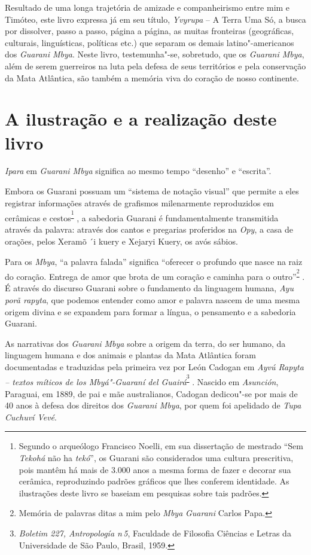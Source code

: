 Resultado de uma longa trajetória de amizade e companheirismo entre mim
e Timóteo, este livro expressa já em seu
título, \emph{{Yvyrupa}} {-- A Terra Uma Só}, a busca por
dissolver, passo a passo, página a página, as muitas fronteiras
(geográficas, culturais, linguísticas, políticas etc.) que separam os
demais latino"-americanos dos \emph{Guarani Mbya}. Neste livro,
testemunha"-se, sobretudo, que os \emph{Guarani Mbya}, além de serem
guerreiros na luta pela defesa de seus territórios e pela conservação da
Mata Atlântica, são também a memória viva do coração de nosso
continente.

 

 

\section{A ilustração e a realização deste livro}

\emph{Ipara} em \emph{Guarani Mbya} significa ao mesmo tempo ``desenho''
e ``escrita''.

Embora os Guarani possuam um ``sistema de notação visual'' que permite a
eles registrar informações através de grafismos milenarmente
reproduzidos em cerâmicas e cestos\textsuperscript{\footnote{ Segundo o arqueólogo Francisco Noelli, em sua dissertação de mestrado
``Sem \emph{Tekohá} não ha \emph{tekó}'', os Guarani são considerados
uma cultura prescritiva, pois mantêm há mais de 3.000 anos a mesma forma
de fazer e decorar sua cerâmica, reproduzindo padrões gráficos que lhes
conferem identidade. As ilustrações deste livro se baseiam em pesquisas
sobre tais padrões.} },
a sabedoria Guarani é fundamentalmente transmitida através da palavra:
através dos cantos e pregarias proferidos na \emph{Opy}, a casa de
orações, pelos Xeramõ ´i kuery e Xejaryi Kuery, os avós sábios.

Para os \emph{Mbya}, ``a palavra falada'' significa ``oferecer o
profundo que nasce na raiz do coração. Entrega de amor que brota de um
coração e caminha para o outro''\textsuperscript{\footnote{ Memória de palavras ditas a mim pelo \emph{Mbya} \emph{Guarani} Carlos
Papa.} }. É através do discurso Guarani sobre o fundamento da linguagem humana,
\emph{Ayu porã rapyta}, que podemos entender como amor e palavra nascem
de uma mesma origem divina e se expandem para formar a língua, o
pensamento e a sabedoria Guarani.

As narrativas dos \emph{Guarani Mbya} sobre a origem da terra, do ser
humano, da linguagem humana e dos animais e plantas da Mata Atlântica
foram documentadas e traduzidas pela primeira vez por León Cadogan em
\emph{Ayvú Rapyta -- textos míticos de los Mbyá"-Guaraní del
Guairá}\textsuperscript{\footnote{ \emph{Boletim 227, Antropología n\,5}, Faculdade de Filosofia Ciências e
Letras da Universidade de São Paulo, Brasil, 1959.} }. Nascido em
\emph{Asunción}, Paraguai, em 1889, de pai e mãe australianos, Cadogan
dedicou"-se por mais de 40 anos à defesa dos direitos dos \emph{Guarani
Mbya}, por quem foi apelidado de \emph{Tupa Cuchuví Vevé}.

